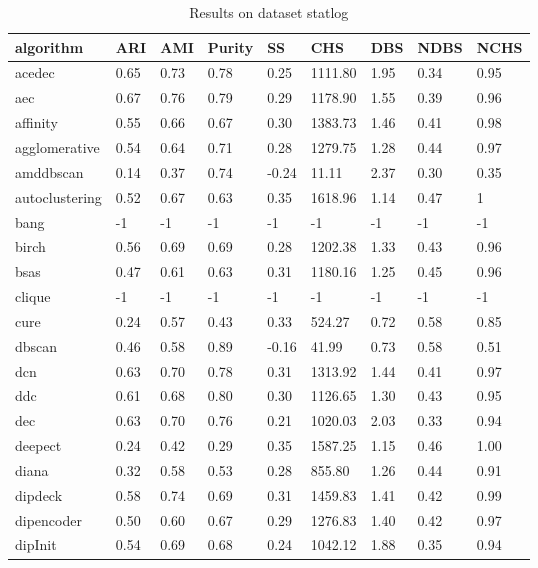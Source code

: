 \begin{table}[H]
\centering
\caption{Results on dataset statlog}
\label{tab:params:statlog}
\begin{tabular}{|l|l|l|l|l|l|l|l|l|}
\hline
algorithm & ARI & AMI & Purity & SS & CHS & DBS & NDBS & NCHS \\
\hline
acedec & 0.65 & 0.73 & 0.78 & 0.25 & 1111.80 & 1.95 & 0.34 & 0.95 \\
\hline
aec & 0.67 & 0.76 & 0.79 & 0.29 & 1178.90 & 1.55 & 0.39 & 0.96 \\
\hline
affinity & 0.55 & 0.66 & 0.67 & 0.30 & 1383.73 & 1.46 & 0.41 & 0.98 \\
\hline
agglomerative & 0.54 & 0.64 & 0.71 & 0.28 & 1279.75 & 1.28 & 0.44 & 0.97 \\
\hline
amddbscan & 0.14 & 0.37 & 0.74 & -0.24 & 11.11 & 2.37 & 0.30 & 0.35 \\
\hline
autoclustering & 0.52 & 0.67 & 0.63 & 0.35 & 1618.96 & 1.14 & 0.47 & 1 \\
\hline
bang & -1 & -1 & -1 & -1 & -1 & -1 & -1 & -1 \\
\hline
birch & 0.56 & 0.69 & 0.69 & 0.28 & 1202.38 & 1.33 & 0.43 & 0.96 \\
\hline
bsas & 0.47 & 0.61 & 0.63 & 0.31 & 1180.16 & 1.25 & 0.45 & 0.96 \\
\hline
clique & -1 & -1 & -1 & -1 & -1 & -1 & -1 & -1 \\
\hline
cure & 0.24 & 0.57 & 0.43 & 0.33 & 524.27 & 0.72 & 0.58 & 0.85 \\
\hline
dbscan & 0.46 & 0.58 & 0.89 & -0.16 & 41.99 & 0.73 & 0.58 & 0.51 \\
\hline
dcn & 0.63 & 0.70 & 0.78 & 0.31 & 1313.92 & 1.44 & 0.41 & 0.97 \\
\hline
ddc & 0.61 & 0.68 & 0.80 & 0.30 & 1126.65 & 1.30 & 0.43 & 0.95 \\
\hline
dec & 0.63 & 0.70 & 0.76 & 0.21 & 1020.03 & 2.03 & 0.33 & 0.94 \\
\hline
deepect & 0.24 & 0.42 & 0.29 & 0.35 & 1587.25 & 1.15 & 0.46 & 1.00 \\
\hline
diana & 0.32 & 0.58 & 0.53 & 0.28 & 855.80 & 1.26 & 0.44 & 0.91 \\
\hline
dipdeck & 0.58 & 0.74 & 0.69 & 0.31 & 1459.83 & 1.41 & 0.42 & 0.99 \\
\hline
dipencoder & 0.50 & 0.60 & 0.67 & 0.29 & 1276.83 & 1.40 & 0.42 & 0.97 \\
\hline
dipInit & 0.54 & 0.69 & 0.68 & 0.24 & 1042.12 & 1.88 & 0.35 & 0.94 \\

\end{tabular}
\end{table}
